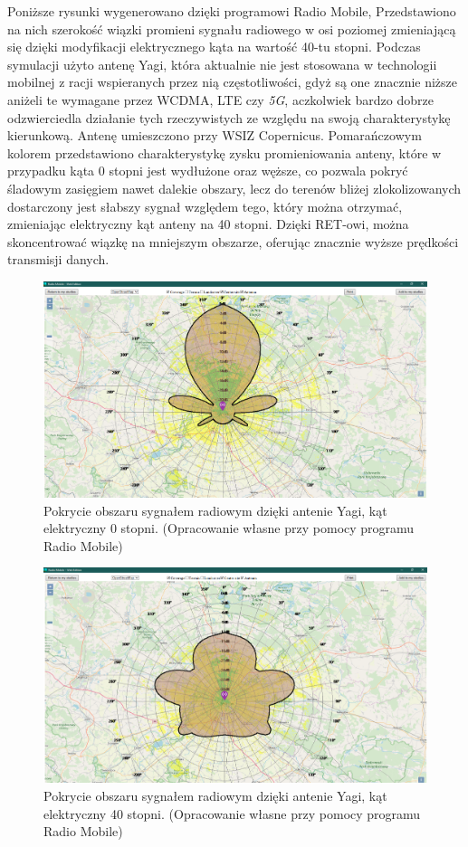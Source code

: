 		Poniższe rysunki wygenerowano dzięki programowi Radio Mobile\cite{RADIO_MOBILE_PAGE_1},
		Przedstawiono na nich szerokość wiązki promieni sygnału radiowego w osi poziomej\cite{BEAMWIDTH_1}
		zmieniającą się dzięki modyfikacji elektrycznego kąta na wartość 40-tu stopni.
		Podczas symulacji użyto antenę Yagi, która aktualnie nie jest stosowana w technologii mobilnej z racji wspieranych
		przez nią częstotliwości, gdyż są one znacznie niższe aniżeli te wymagane przez WCDMA, LTE czy \textit{5G}, 
		aczkolwiek bardzo dobrze odzwierciedla działanie tych rzeczywistych ze względu na swoją charakterystykę kierunkową.
		\newline
		Antenę umieszczono przy WSIZ Copernicus. \newline
		Pomarańczowym kolorem przedstawiono charakterystykę zysku promieniowania anteny, które w przypadku kąta 0 stopni jest wydłużone oraz węższe,
		co pozwala pokryć śladowym zasięgiem nawet dalekie obszary, lecz do terenów bliżej zlokolizowanych dostarczony
		jest słabszy sygnał względem tego, który można otrzymać, zmieniając elektryczny kąt anteny na 40 stopni.
		Dzięki RET-owi, można skoncentrować wiązkę na mniejszym obszarze, oferując znacznie wyższe prędkości transmisji danych.

		\begin{figure}[h!]
		\centering
		\includegraphics[scale=0.5]{Obrazki/Antenna_Yagi_Angle_0.png}
		\caption{Pokrycie obszaru sygnałem radiowym dzięki antenie Yagi, kąt elektryczny 0 stopni.
			\newline(Opracowanie własne przy pomocy programu Radio Mobile)}
		\end{figure}

		\begin{figure}[h!]
		\centering
		\includegraphics[scale=0.5]{Obrazki/Antenna_Yagi_Angle_40.png}
		\caption{Pokrycie obszaru sygnałem radiowym dzięki antenie Yagi, kąt elektryczny 40 stopni.
			\newline(Opracowanie własne przy pomocy programu Radio Mobile)}
		\end{figure}
